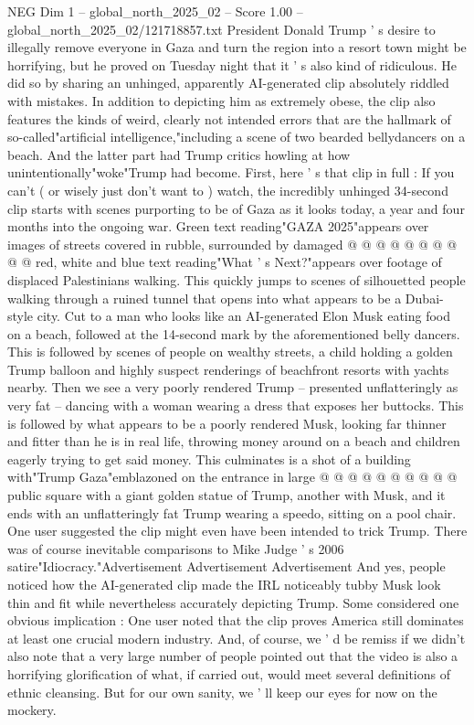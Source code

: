 \begin{textsample}{NEG Dim 1 – global\_north\_2025\_02 – Score 1.00 – global\_north\_2025\_02/121718857.txt}  \label{ex:f1_neg_018}
President Donald Trump ' s desire to illegally remove everyone in Gaza and turn the region into a resort town might be horrifying, but he proved on Tuesday night that it ' s also kind of ridiculous.
He did so by sharing an unhinged, apparently AI-generated clip absolutely riddled with mistakes.
In addition to depicting him as extremely obese, the clip also features the kinds of weird, clearly not intended errors that are the hallmark of so-called"artificial intelligence,"including a scene of two bearded bellydancers on a beach.
And the latter part had Trump critics howling at how unintentionally"woke"Trump had become.
First, here ' s that clip in full : If you can't ( or wisely just don't want to ) watch, the incredibly unhinged 34-second clip starts with scenes purporting to be of Gaza as it looks today, a year and four months into the ongoing war.
Green text reading"GAZA 2025"appears over images of streets covered in rubble, surrounded by damaged @ @ @ @ @ @ @ @ @ @ red, white and blue text reading"What ' s Next?"appears over footage of displaced Palestinians walking.
This quickly jumps to scenes of silhouetted people walking through a ruined tunnel that opens into what appears to be a Dubai-style city.
Cut to a man who looks like an AI-generated Elon Musk eating food on a beach, followed at the 14-second mark by the aforementioned belly dancers.
This is followed by scenes of people on wealthy streets, a child holding a golden Trump balloon and highly suspect renderings of beachfront resorts with yachts nearby.
Then we see a very poorly rendered Trump -- presented unflatteringly as very fat -- dancing with a woman wearing a dress that exposes her buttocks.
This is followed by what appears to be a poorly rendered Musk, looking far thinner and fitter than he is in real life, throwing money around on a beach and children eagerly trying to get said money.
This culminates is a shot of a building with"Trump Gaza"emblazoned on the entrance in large @ @ @ @ @ @ @ @ @ @ public square with a giant golden statue of Trump, another with Musk, and it ends with an unflatteringly fat Trump wearing a speedo, sitting on a pool chair.
One user suggested the clip might even have been intended to trick Trump.
There was of course inevitable comparisons to Mike Judge ' s 2006 satire"Idiocracy."Advertisement Advertisement Advertisement And yes, people noticed how the AI-generated clip made the IRL noticeably tubby Musk look thin and fit while nevertheless accurately depicting Trump.
Some considered one obvious implication : One user noted that the clip proves America still dominates at least one crucial modern industry.
And, of course, we ' d be remiss if we didn't also note that a very large number of people pointed out that the video is also a horrifying glorification of what, if carried out, would meet several definitions of ethnic cleansing.
But for our own sanity, we ' ll keep our eyes for now on the mockery.

\end{textsample}
